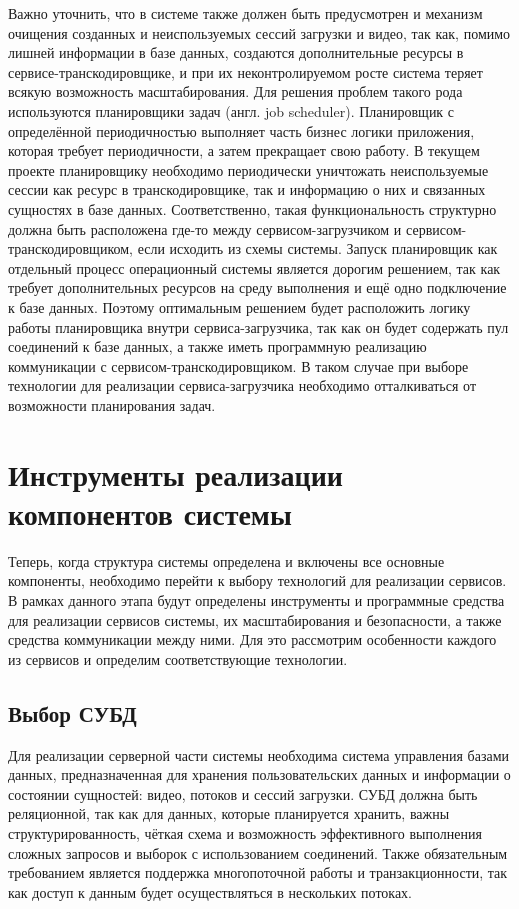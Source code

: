 	Важно уточнить, что в системе также должен быть предусмотрен и механизм очищения созданных и неиспользуемых сессий загрузки и видео, так как, помимо лишней информации в базе данных, создаются дополнительные ресурсы в сервисе-транскодировщике, и при их неконтролируемом росте система теряет всякую возможность масштабирования. Для решения проблем такого рода используются планировщики задач (англ. job scheduler). Планировщик с определённой периодичностью выполняет часть бизнес логики приложения, которая требует периодичности, а затем прекращает свою работу. В текущем проекте планировщику необходимо периодически уничтожать неиспользуемые сессии как ресурс в транскодировщике, так и информацию о них и связанных сущностях в базе данных. Соответственно, такая функциональность структурно должна быть расположена где-то между сервисом-загрузчиком и сервисом-транскодировщиком, если исходить из схемы системы. Запуск планировщик как отдельный процесс операционный системы является дорогим решением, так как требует дополнительных ресурсов на среду выполнения и ещё одно подключение к базе данных. Поэтому оптимальным решением будет расположить логику работы планировщика внутри сервиса-загрузчика, так как он будет содержать пул соединений к базе данных, а также иметь программную реализацию коммуникации с сервисом-транскодировщиком. В таком случае при выборе технологии для реализации сервиса-загрузчика необходимо отталкиваться от возможности планирования задач.

\section{Инструменты реализации компонентов системы}

	Теперь, когда структура системы определена и включены все основные компоненты, необходимо перейти к выбору технологий для реализации сервисов. В рамках данного этапа будут определены инструменты и программные средства для реализации сервисов системы, их масштабирования и безопасности, а также средства коммуникации между ними. Для это рассмотрим особенности каждого из сервисов и определим соответствующие технологии.

	\subsection{Выбор СУБД}

	Для реализации серверной части системы необходима система управления базами данных, предназначенная для хранения пользовательских данных и информации о состоянии сущностей: видео, потоков и сессий загрузки. СУБД должна быть реляционной, так как для данных, которые планируется хранить, важны структурированность, чёткая схема и возможность эффективного выполнения сложных запросов и выборок с использованием соединений. Также обязательным требованием является поддержка многопоточной работы и транзакционности, так как доступ к данным будет осуществляться в нескольких потоках.

